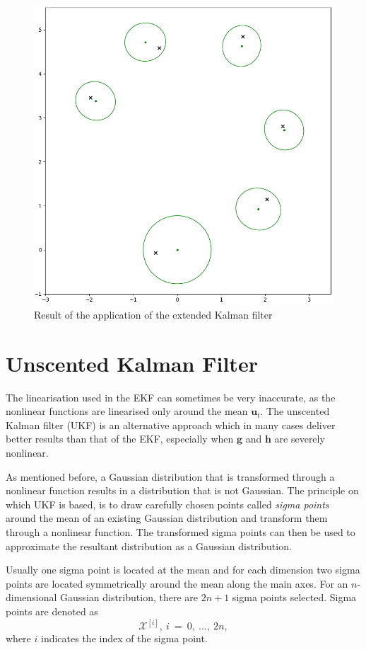 \documentclass[12pt,oneside,openany,a4paper, %
afrikaans,english,
]{memoir}
\numberwithin{equation}{chapter}
\begin{document}
\begin{figure}[H]
  \includegraphics[width=0.7\linewidth]{Figures/result_EKF.png}
  \centering
  \caption{Result of the application of the extended Kalman filter}
  \label{fig:resultEKF}
\end{figure}

\section{Unscented Kalman Filter}\label{sec:UKF}
The linearisation used in the EKF can sometimes be very inaccurate, as the nonlinear functions are linearised only around the mean $\bm{u}_t$. The unscented Kalman filter (UKF) is an alternative approach which in many cases deliver better results than that of the EKF, especially when $\bm{g}$ and $\bm{h}$ are severely nonlinear.

As mentioned before, a Gaussian distribution that is transformed through a nonlinear function results in a distribution that is not Gaussian. The principle on which UKF is based, is to draw carefully chosen points called \textit{sigma points} around the mean of an existing Gaussian distribution and transform them through a nonlinear function. The transformed sigma points can then be used to approximate the resultant distribution as a Gaussian distribution.

Usually one sigma point is located at the mean and for each dimension two sigma points are located symmetrically around the mean along the main axes. For an $n$-dimensional Gaussian distribution, there are $2n +1$ sigma points selected. Sigma points are denoted as
\begin{equation}
\mathcal{X}^{[i]},\ i\ = \ 0,\ ...,\ 2n,
\end{equation}
where $i$ indicates the index of the sigma point.
\end{document}
